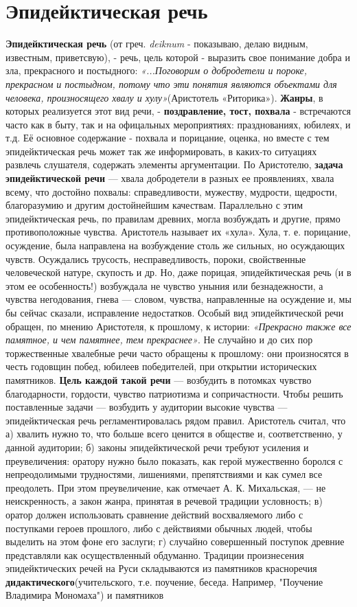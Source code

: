 \chapter{\textbf{Эпидейктическая речь}}
\textbf{Эпидейктическая речь} (от греч.  \textit{deiknum }- показываю, делаю видным, известным, приветсвую), - речь, цель которой - выразить свое понимание добра и зла, прекрасного и постыдного:  \textit{«...Поговорим о добродетели и пороке, прекрасном и постыдном, потому что эти понятия являются объектами для человека, произносящего хвалу и хулу»}(Аристотель «Риторика»). \textbf{Жанры}, в которых реализуется этот вид речи, - \textbf{поздравление, тост, похвала} - встречаются часто как в быту, так и на офицальных мероприятиях: празднованиях, юбилеях, и т.д. Её основное содержание - похвала и порицание, оценка, но вместе с тем эпидейктическая речь может так же информировать, в каких-то ситуациях развлечь слушателя, содержать элементы аргументации. По Аристотелю, \textbf{задача эпидейктической речи} — хвала добродетели в разных ее проявлениях, хвала всему, что достойно похвалы: справедливости, мужеству, мудрости, щедрости, благоразумию и другим достойнейшим качествам. Параллельно с этим эпидейктическая речь, по правилам древних, могла возбуждать и другие, прямо противоположные чувства. Аристотель называет их «хула». Хула, т. е. порицание, осуждение, была направлена на возбуждение столь же сильных, но осуждающих чувств. Осуждались трусость, несправедливость, пороки, свойственные человеческой натуре, скупость и др. Но, даже порицая, эпидейктическая речь (и в этом ее особенность!) возбуждала не чувство уныния или безнадежности, а чувства негодования, гнева — словом, чувства, направленные на осуждение и, мы бы сейчас сказали, исправление недостатков. Особый вид эпидейктической речи обращен, по мнению Аристотеля, к прошлому, к истории: \textit{«Прекрасно также все памятное, и чем памятнее, тем прекраснее»}. Не случайно и до сих пор торжественные хвалебные речи часто обращены к прошлому: они произносятся в честь годовщин побед, юбилеев победителей, при открытии исторических памятников.\textbf{ Цель каждой такой речи} — возбудить в потомках чувство благодарности, гордости, чувство патриотизма и сопричастности. Чтобы решить поставленные задачи —  возбудить у аудитории высокие чувства — эпидейктическая речь регламентировалась рядом правил. Аристотель считал, что а) хвалить нужно то, что больше всего ценится в обществе и, соответственно, у данной аудитории; б) законы эпидейктической речи требуют усиления и преувеличения: оратору нужно было показать, как герой мужественно боролся с непреодолимыми трудностями, лишениями, препятствиями и как сумел все преодолеть. При этом преувеличение, как отмечает А. К. Михальская, — не неискренность, а закон жанра, принятая в речевой традиции условность; в) оратор должен использовать сравнение действий восхваляемого либо с поступками героев прошлого, либо с действиями обычных людей, чтобы выделить на этом фоне его заслуги; г) случайно совершенный поступок древние представляли как осуществленный обдуманно. Традиции произнесения эпидейктических речей на Руси складываются из памятников красноречия \textbf{дидактического}(учительского, т.е. поучение, беседа. Например, "Поучение Владимира Мономаха") и памятников 